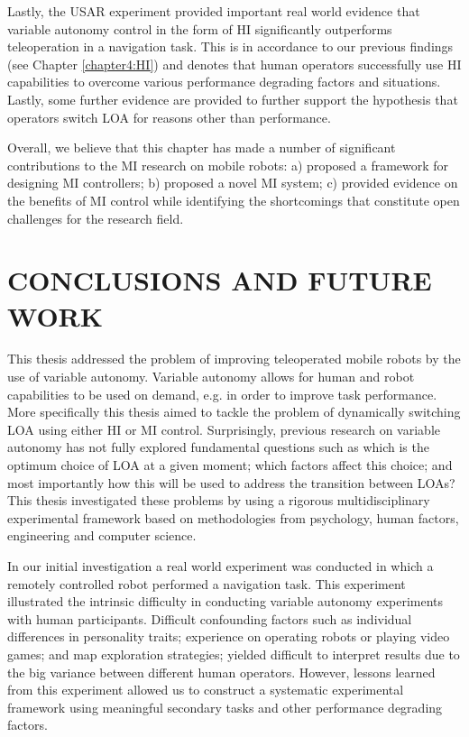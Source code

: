 \documentclass[a4paper,12pt,oneside,openright]{bhamthesis}
\begin{document}
Lastly, the USAR experiment provided important real world evidence that variable autonomy control in the form of HI significantly outperforms teleoperation in a navigation task. This is in accordance to our previous findings (see Chapter \ref{chapter4:HI}) and denotes that human operators successfully use HI capabilities to overcome various performance degrading factors and situations. Lastly, some further evidence are provided to further support the hypothesis that operators switch LOA for reasons other than performance. 

Overall, we believe that this chapter has made a number of significant contributions to the MI research on mobile robots: a) proposed a framework for designing MI controllers; b) proposed a novel MI system; c) provided evidence on the benefits of MI control while identifying the shortcomings that constitute open challenges for the research field.


\chapter{CONCLUSIONS AND FUTURE WORK}
\label{chapter6:conlcusion}
This thesis addressed the problem of improving teleoperated mobile robots by the use of variable autonomy. Variable autonomy allows for human and robot capabilities to be used on demand, e.g. in order to improve task performance. More specifically this thesis aimed to tackle the problem of dynamically switching LOA using either HI or MI control. Surprisingly, previous research on variable autonomy has not fully explored fundamental questions such as which is the optimum choice of LOA at a given moment; which factors affect this choice; and most importantly how this will be used to address the transition between LOAs? This thesis investigated these problems by using a rigorous multidisciplinary experimental framework based on methodologies from psychology, human factors, engineering and computer science.

In our initial investigation a real world experiment was conducted in which a remotely controlled robot performed a navigation task. This experiment illustrated the intrinsic difficulty in conducting variable autonomy experiments with human participants. Difficult confounding factors such as individual differences in personality traits; experience on operating robots or playing video games; and map exploration strategies; yielded difficult to interpret results due to the big variance between different human operators. However, lessons learned from this experiment allowed us to construct a systematic experimental framework using meaningful secondary tasks and other performance degrading factors. 
\end{document}
